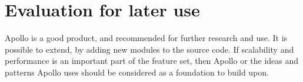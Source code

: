 \section{Evaluation for later use}

Apollo is a good product, and recommended for further research and use. It is possible to extend, by adding new modules to the source code. If scalability and performance is an important part of the feature set, then Apollo or the ideas and patterns Apollo uses should be considered as a foundation to build upon.
